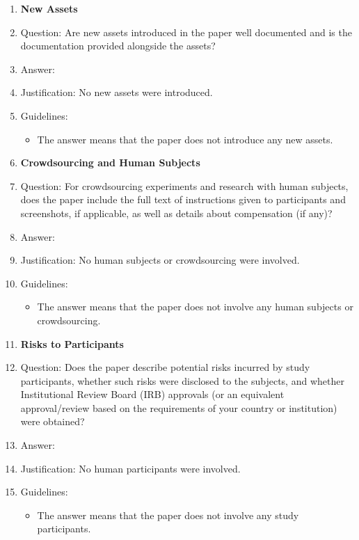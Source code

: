 \begin{enumerate}
\item {\bf New Assets}
    \item[] Question: Are new assets introduced in the paper well documented and is the documentation provided alongside the assets?
    \item[] Answer: \answerNA{}
    \item[] Justification: No new assets were introduced.
    \item[] Guidelines:
    \begin{itemize}
        \item The answer \answerNA{} means that the paper does not introduce any new assets.
    \end{itemize}

\item {\bf Crowdsourcing and Human Subjects}
    \item[] Question: For crowdsourcing experiments and research with human subjects, does the paper include the full text of instructions given to participants and screenshots, if applicable, as well as details about compensation (if any)? 
    \item[] Answer: \answerNA{}
    \item[] Justification: No human subjects or crowdsourcing were involved.
    \item[] Guidelines:
    \begin{itemize}
        \item The answer \answerNA{} means that the paper does not involve any human subjects or crowdsourcing.
    \end{itemize}

\item {\bf Risks to Participants}
    \item[] Question: Does the paper describe potential risks incurred by study participants, whether such risks were disclosed to the subjects, and whether Institutional Review Board (IRB) approvals (or an equivalent approval/review based on the requirements of your country or institution) were obtained?
    \item[] Answer: \answerNA{}
    \item[] Justification: No human participants were involved.
    \item[] Guidelines:
    \begin{itemize}
        \item The answer \answerNA{} means that the paper does not involve any study participants.
    \end{itemize}


\end{enumerate}
